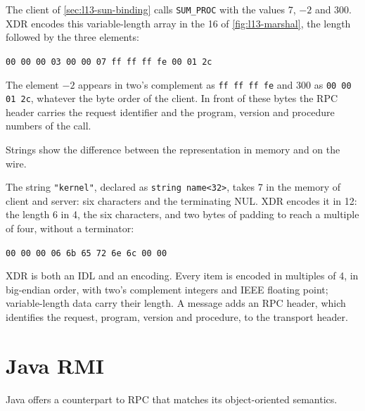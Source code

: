 \documentclass[../main.tex]{subfiles}
\begin{document}
\begin{example}
  \label{ex:l13-encoding}
  The client of \cref{sec:l13-sun-binding} calls \texttt{SUM\_PROC} with the
  values 7, $-2$ and 300.  XDR encodes this variable-length array in the
  \SI{16}{\byte} of \cref{fig:l13-marshal}, the length followed by the three
  elements:
  \begin{center}
    \texttt{00 00 00 03  00 00 07 \quad ff ff ff fe  00 01 2c}
  \end{center}
  The element $-2$ appears in two's complement as \texttt{ff ff ff fe} and
  300 as \texttt{00 00 01 2c}, whatever the byte order of the client.  In
  front of these bytes the RPC header carries the request identifier and
  the program, version and procedure numbers of the call.
\end{example}

Strings show the difference between the representation in memory and on
the wire.

\begin{example}
  \label{ex:l13-string}
  The string \texttt{"kernel"}, declared as \texttt{string name<32>}, takes
  \SI{7}{\byte} in the memory of client and server: six characters and the
  terminating NUL.  XDR encodes it in \SI{12}{\byte}: the length 6 in
  \SI{4}{\byte}, the six characters, and two bytes of padding to reach a
  multiple of four, without a terminator:
  \begin{center}
    \texttt{00 00 00 06 \quad 6b 65 72 6e  6c 00 00}
  \end{center}
\end{example}

\begin{keypoint}
  XDR is both an IDL and an encoding.  Every item is encoded in multiples
  of \SI{4}{\byte}, in big-endian order, with two's complement integers and
  IEEE floating point; variable-length data carry their length.  A message
  adds an RPC header, which identifies the request, program, version and
  procedure, to the transport header.
\end{keypoint}

\section{Java RMI}
\label{sec:l13-rmi}

Java offers a counterpart to RPC that matches its object-oriented
semantics.
\end{document}
